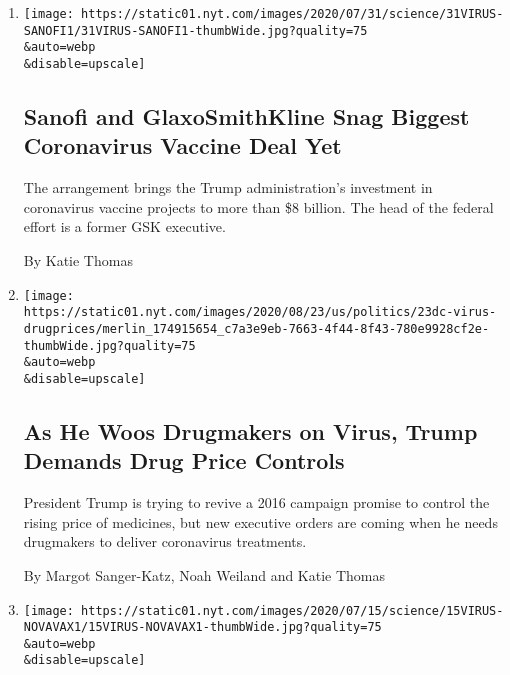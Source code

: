 \begin{enumerate}
\def\labelenumi{\arabic{enumi}.}
\item
  \href{/2020/07/31/health/covid-19-vaccine-sanofi-gsk.html}{}

  \texttt{[image: https://static01.nyt.com/images/2020/07/31/science/31VIRUS-SANOFI1/31VIRUS-SANOFI1-thumbWide.jpg?quality=75\\\&auto=webp\\\&disable=upscale]}

  \hypertarget{sanofi-and-glaxosmithkline-snag-biggest-coronavirus-vaccine-deal-yet}{%
  \subsection{Sanofi and GlaxoSmithKline Snag Biggest Coronavirus
  Vaccine Deal
  Yet}\label{sanofi-and-glaxosmithkline-snag-biggest-coronavirus-vaccine-deal-yet}}

  The arrangement brings the Trump administration's investment in
  coronavirus vaccine projects to more than \$8 billion. The head of the
  federal effort is a former GSK executive.

  By Katie Thomas
\item
  \href{/2020/07/24/us/politics/trump-drug-prices-coronavirus.html}{}

  \texttt{[image: https://static01.nyt.com/images/2020/08/23/us/politics/23dc-virus-drugprices/merlin\_174915654\_c7a3e9eb-7663-4f44-8f43-780e9928cf2e-thumbWide.jpg?quality=75\\\&auto=webp\\\&disable=upscale]}

  \hypertarget{as-he-woos-drugmakers-on-virus-trump-demands-drug-price-controls}{%
  \subsection{As He Woos Drugmakers on Virus, Trump Demands Drug Price
  Controls}\label{as-he-woos-drugmakers-on-virus-trump-demands-drug-price-controls}}

  President Trump is trying to revive a 2016 campaign promise to control
  the rising price of medicines, but new executive orders are coming
  when he needs drugmakers to deliver coronavirus treatments.

  By Margot Sanger-Katz, Noah Weiland and Katie Thomas
\item
  \href{/2020/07/16/health/coronavirus-vaccine-novavax.html}{}

  \texttt{[image: https://static01.nyt.com/images/2020/07/15/science/15VIRUS-NOVAVAX1/15VIRUS-NOVAVAX1-thumbWide.jpg?quality=75\\\&auto=webp\\\&disable=upscale]}


\end{enumerate}

